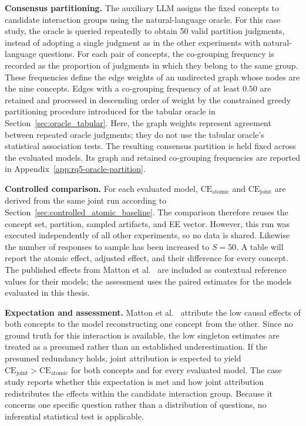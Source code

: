 \noindent\textbf{Consensus partitioning.} The auxiliary LLM assigns the fixed concepts to candidate interaction groups using the natural-language oracle. For this case study, the oracle is queried repeatedly to obtain 50 valid partition judgments, instead of adopting a single judgment as in the other experiments with natural-language questions. For each pair of concepts, the co-grouping frequency is recorded as the proportion of judgments in which they belong to the same group. These frequencies define the edge weights of an undirected graph whose nodes are the nine concepts. Edges with a co-grouping frequency of at least $0.50$ are retained and processed in descending order of weight by the constrained greedy partitioning procedure introduced for the tabular oracle in Section~\ref{sec:oracle_tabular}. Here, the graph weights represent agreement between repeated oracle judgments; they do not use the tabular oracle's statistical association tests. The resulting consensus partition is held fixed across the evaluated models. Its graph and retained co-grouping frequencies are reported in Appendix~\ref{app:rq5-oracle-partition}.

\noindent\textbf{Controlled comparison.} For each evaluated model, $\mathrm{CE}_{\mathrm{atomic}}$ and $\mathrm{CE}_{\mathrm{joint}}$ are derived from the same joint run according to Section~\ref{sec:controlled_atomic_baseline}. The comparison therefore reuses the concept set, partition, sampled artifacts, and EE vector. However, this run was executed independently of all other experiments, so no data is shared. Likewise the number of responses to sample has been increased to $S=50$. A table will report the atomic effect, adjusted effect, and their difference for every concept. The published effects from Matton et al.~\cite{mattonWalkTalkMeasuring2024} are included as contextual reference values for their models; the assessment uses the paired estimates for the models evaluated in this thesis.

\noindent\textbf{Expectation and assessment.} Matton et al.~\cite{mattonWalkTalkMeasuring2024} attribute the low causal effects of both concepts to the model reconstructing one concept from the other. Since no ground truth for this interaction is available, the low singleton estimates are treated as a presumed rather than an established underestimation. If the presumed redundancy holds, joint attribution is expected to yield $\mathrm{CE}_{\mathrm{joint}} > \mathrm{CE}_{\mathrm{atomic}}$ for both concepts and for every evaluated model. The case study reports whether this expectation is met and how joint attribution redistributes the effects within the candidate interaction group. Because it concerns one specific question rather than a distribution of questions, no inferential statistical test is applicable.
